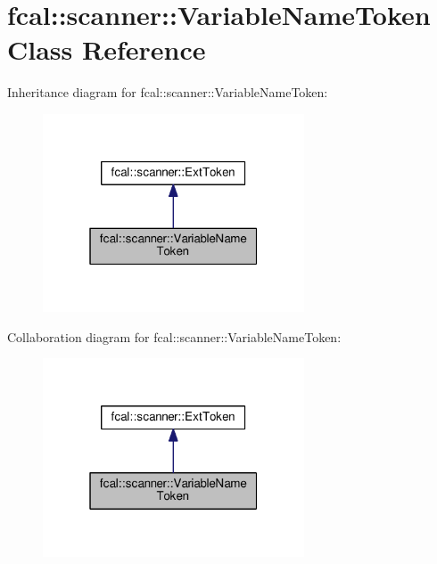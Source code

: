\hypertarget{classfcal_1_1scanner_1_1VariableNameToken}{}\section{fcal\+:\+:scanner\+:\+:Variable\+Name\+Token Class Reference}
\label{classfcal_1_1scanner_1_1VariableNameToken}


Inheritance diagram for fcal\+:\+:scanner\+:\+:Variable\+Name\+Token\+:
\nopagebreak
\begin{figure}[H]
\begin{center}
\leavevmode
\includegraphics[width=220pt]{classfcal_1_1scanner_1_1VariableNameToken__inherit__graph}
\end{center}
\end{figure}


Collaboration diagram for fcal\+:\+:scanner\+:\+:Variable\+Name\+Token\+:
\nopagebreak
\begin{figure}[H]
\begin{center}
\leavevmode
\includegraphics[width=220pt]{classfcal_1_1scanner_1_1VariableNameToken__coll__graph}
\end{center}
\end{figure}
